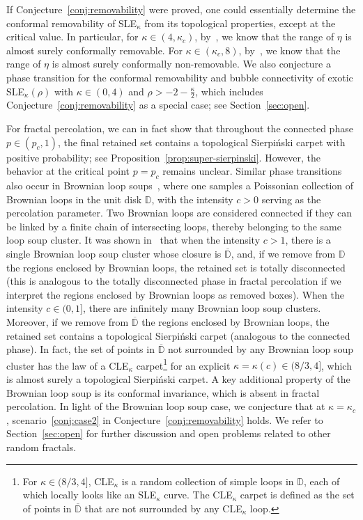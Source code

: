 \documentclass[a4paper]{article}
\numberwithin{equation}{section}
\numberwithin{equation}{section}
\renewcommand{\1}{\mathbf{1}}
\begin{document}
If Conjecture~\ref{conj:removability} were proved, one could essentially determine the conformal removability of SLE$_\kappa$ from its topological properties, except at the critical value. In particular, for $\kappa \in (4,\kappa_c)$, by~\cite{KMS-removability-nonsimple}, we know that the range of $\eta$ is almost surely conformally removable. For $\kappa \in (\kappa_c,8)$, by~\cite{Ntalampekos-carpet}, we know that the range of $\eta$ is almost surely conformally non-removable. We also conjecture a phase transition for the conformal removability and bubble connectivity of exotic SLE$_\kappa(\rho)$ with $\kappa \in (0,4)$ and $\rho>-2-\frac{\kappa}{2}$, which includes Conjecture~\ref{conj:removability} as a special case; see Section~\ref{sec:open}.

For fractal percolation, we can in fact show that throughout the connected phase $p \in (p_c, 1)$, the final retained set contains a topological Sierpi\'nski carpet with positive probability; see Proposition~\ref{prop:super-sierpinski}. However, the behavior at the critical point $p = p_c$ remains unclear. Similar phase transitions also occur in Brownian loop soups~\cite{SW-CLE}, where one samples a Poissonian collection of Brownian loops in the unit disk $\mathbb D$, with the intensity $c >0$ serving as the percolation parameter. Two Brownian loops are considered connected if they can be linked by a finite chain of intersecting loops, thereby belonging to the same loop soup cluster. It was shown in~\cite{SW-CLE} that when the intensity $c>1$, there is a single Brownian loop soup cluster whose closure is $\overline{\mathbb{D}}$, and, if we remove from $\mathbb{D}$ the regions enclosed by Brownian loops, the retained set is totally disconnected (this is analogous to the totally disconnected phase in fractal percolation if we interpret the regions enclosed by Brownian loops as removed boxes). When the intensity $c \in (0,1]$, there are infinitely many Brownian loop soup clusters. Moreover, if we remove from $\overline{\mathbb{D}}$ the regions enclosed by Brownian loops, the retained set contains a topological Sierpi\'nski carpet (analogous to the connected phase). In fact, the set of points in $\overline{\mathbb D}$ not surrounded by any Brownian loop soup cluster has the law of a CLE$_\kappa$ carpet\footnote{For $\kappa \in (8/3,4]$, CLE$_\kappa$ is a random collection of simple loops in $\mathbb{D}$, each of which locally looks like an SLE$_\kappa$ curve. The CLE$_\kappa$ carpet is defined as the set of points in $\overline{\mathbb{D}}$ that are not surrounded by any CLE$_\kappa$ loop.} for an explicit $\kappa = \kappa(c) \in (8/3,4]$, which is almost surely a topological Sierpi\'nski carpet. A key additional property of the Brownian loop soup is its conformal invariance, which is absent in fractal percolation. In light of the Brownian loop soup case, we conjecture that at $\kappa = \kappa_c$, scenario~\eqref{conj:case2} in Conjecture~\ref{conj:removability} holds. We refer to Section~\ref{sec:open} for further discussion and open problems related to other random fractals.
\end{document}
